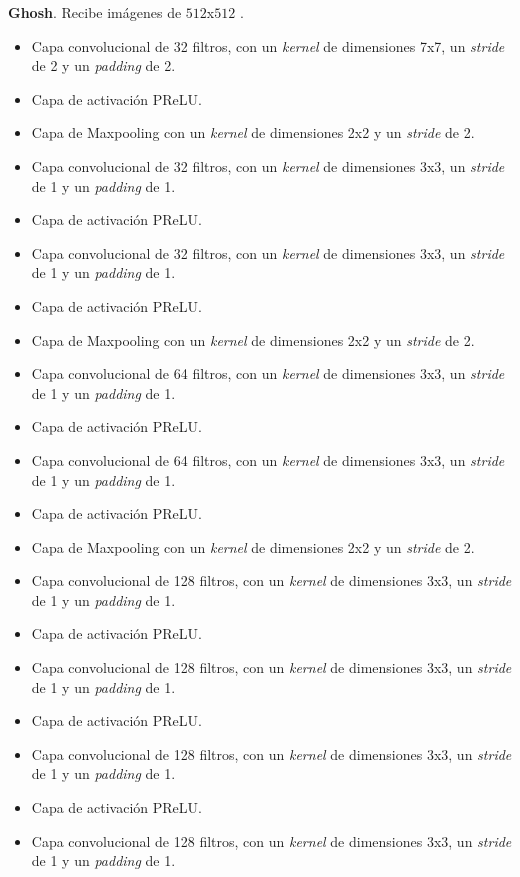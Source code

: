 \textbf{Ghosh}. Recibe imágenes de $512$x$512$ \cite{CNNarch:Ghosh}.
\begin{itemize}
    \item Capa convolucional de 32 filtros, con un \textit{kernel} de dimensiones 7x7, un \textit{stride} de 2 y un \textit{padding} de 2.
    \item Capa de activación PReLU.
    \item Capa de Maxpooling con un \textit{kernel} de dimensiones 2x2 y un \textit{stride} de 2. 
    \item Capa convolucional de 32 filtros, con un \textit{kernel} de dimensiones 3x3, un \textit{stride} de 1 y un \textit{padding} de 1.
    \item Capa de activación PReLU.
    \item Capa convolucional de 32 filtros, con un \textit{kernel} de dimensiones 3x3, un \textit{stride} de 1 y un \textit{padding} de 1.
    \item Capa de activación PReLU.
    \item Capa de Maxpooling con un \textit{kernel} de dimensiones 2x2 y un \textit{stride} de 2.
    \item Capa convolucional de 64 filtros, con un \textit{kernel} de dimensiones 3x3, un \textit{stride} de 1 y un \textit{padding} de 1.
    \item Capa de activación PReLU.
    \item Capa convolucional de 64 filtros, con un \textit{kernel} de dimensiones 3x3, un \textit{stride} de 1 y un \textit{padding} de 1.
    \item Capa de activación PReLU.
    \item Capa de Maxpooling con un \textit{kernel} de dimensiones 2x2 y un \textit{stride} de 2.
    \item Capa convolucional de 128 filtros, con un \textit{kernel} de dimensiones 3x3, un \textit{stride} de 1 y un \textit{padding} de 1.
    \item Capa de activación PReLU.
    \item Capa convolucional de 128 filtros, con un \textit{kernel} de dimensiones 3x3, un \textit{stride} de 1 y un \textit{padding} de 1.
    \item Capa de activación PReLU.
    \item Capa convolucional de 128 filtros, con un \textit{kernel} de dimensiones 3x3, un \textit{stride} de 1 y un \textit{padding} de 1.
    \item Capa de activación PReLU.
    \item Capa convolucional de 128 filtros, con un \textit{kernel} de dimensiones 3x3, un \textit{stride} de 1 y un \textit{padding} de 1.

\end{itemize}
